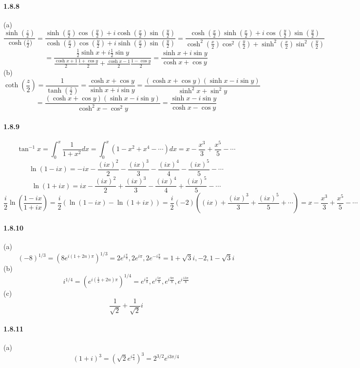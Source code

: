 \documentclass[a4paper]{article}
\begin{document}
\paragraph{1.8.8}
(a) 
\[\frac{\sinh{(\frac{z}{2})}}{\cosh{(\frac{z}{2}})}=\frac{\sinh{(\frac{x}{2})}\cos{(\frac{y}{2})}+i\cosh{(\frac{x}{2})}\sin{(\frac{y}{2})}}{\cosh{(\frac{x}{2})}\cos{(\frac{y}{2})}+i\sinh{(\frac{x}{2})}\sin{(\frac{y}{2})}}=\frac{\cosh(\frac{x}{2})\sinh(\frac{x}{2})+i\cos(\frac{y}{2})\sin(\frac{y}{2})}{\cosh^2(\frac{x}{2})\cos^2(\frac{y}{2})+\sinh^2(\frac{x}{2})\sin^2(\frac{y}{2})}\]
\[=\frac{\frac{1}{2}\sinh{x}+i\frac{1}{2}\sin{y}}{\frac{\cosh{x}+1}{2}\frac{1+\cos{y}}{2}+\frac{\cosh{x}-1}{2}\frac{1-\cos{y}}{2}}=\frac{\sinh{x}+i\sin{y}}{\cosh{x}+\cos{y}}\]
(b)
\[\coth(\frac{z}{2})=\frac{1}{\tanh(\frac{z}{2})}=\frac{\cosh{x}+\cos{y}}{\sinh{x}+i\sin{y}}=\frac{(\cosh{x}+\cos{y})(\sinh{x}-i\sin{y})}{\sinh^2{x}+\sin^2{y}}\]
\[=\frac{(\cosh{x}+\cos{y})(\sinh{x}-i\sin{y})}{\cosh^2{x}-\cos^2{y}}=\frac{\sinh{x}-i\sin{y}}{\cosh{x}-\cos{y}}\]

\paragraph{1.8.9}
\[\tan^{-1}x=\int_0^x\frac{1}{1+x^2}dx=\int_0^x(1-x^2+x^4-\cdots)dx=x-\frac{x^3}{3}+\frac{x^5}{5}-\cdots\]
\[\ln(1-ix)=-{ix}-\frac{(ix)^2}{2}-\frac{(ix)^3}{3}-\frac{(ix)^4}{4}-\frac{(ix)^5}{5}-\cdots\]
\[\ln(1+ix)={ix}-\frac{(ix)^2}{2}+\frac{(ix)^3}{3}-\frac{(ix)^4}{4}+\frac{(ix)^5}{5}-\cdots\]
\[\frac{i}{2}\ln\left(\frac{1-ix}{1+ix} \right)=\frac{i}{2}\left(\ln(1-ix)-\ln(1+ix) \right)=\frac{i}{2}(-2)\left((ix)+\frac{(ix)^3}{3}+\frac{(ix)^5}{5}+\cdots \right)=x-\frac{x^3}{3}+\frac{x^5}{5}-\cdots\]

\paragraph{1.8.10}
(a) \[(-8)^{1/3}=\left(8e^{i(1+2n)\pi} \right)^{1/3}=2e^{i\frac{\pi}{3}}, 2e^{i\pi},2e^{-i\frac{\pi}{3}}=1+\sqrt{3}i,-2,1-\sqrt{3}i\]
(b) \[i^{1/4}=(e^{i(\frac{1}{2}+2n)\pi})^{1/4}=e^{i\frac{\pi}{8}},e^{i\frac{5\pi}{8}},e^{i\frac{9\pi}{8}},e^{i\frac{13\pi}{8}} \] 
(c) \[\frac{1}{\sqrt{2}}+\frac{1}{\sqrt{2}}i\]

\paragraph{1.8.11}
(a) \[(1+i)^3=\left(\sqrt{2}e^{i\frac{\pi}{4}} \right)^3=2^{3/2}e^{i3\pi/4}\]
\end{document}
